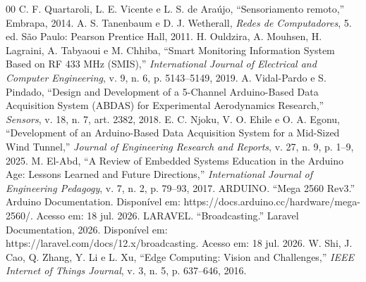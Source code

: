 \documentclass[conference]{IEEEtran}
\begin{document}
\begin{thebibliography}{00}
 C. F. Quartaroli, L. E. Vicente e L. S. de Araújo, ``Sensoriamento remoto,'' Embrapa, 2014.
 A. S. Tanenbaum e D. J. Wetherall, \textit{Redes de Computadores}, 5. ed. São Paulo: Pearson Prentice Hall, 2011.
 H. Ouldzira, A. Mouhsen, H. Lagraini, A. Tabyaoui e M. Chhiba, ``Smart Monitoring Information System Based on RF 433 MHz (SMIS),'' \textit{International Journal of Electrical and Computer Engineering}, v. 9, n. 6, p. 5143--5149, 2019.
 A. Vidal-Pardo e S. Pindado, ``Design and Development of a 5-Channel Arduino-Based Data Acquisition System (ABDAS) for Experimental Aerodynamics Research,'' \textit{Sensors}, v. 18, n. 7, art. 2382, 2018.
 E. C. Njoku, V. O. Ehile e O. A. Egonu, ``Development of an Arduino-Based Data Acquisition System for a Mid-Sized Wind Tunnel,'' \textit{Journal of Engineering Research and Reports}, v. 27, n. 9, p. 1--9, 2025.
 M. El-Abd, ``A Review of Embedded Systems Education in the Arduino Age: Lessons Learned and Future Directions,'' \textit{International Journal of Engineering Pedagogy}, v. 7, n. 2, p. 79--93, 2017.
 ARDUINO. ``Mega 2560 Rev3.'' Arduino Documentation. Dispon\'ivel em: https://docs.arduino.cc/hardware/mega-2560/. Acesso em: 18 jul. 2026.
 LARAVEL. ``Broadcasting.'' Laravel Documentation, 2026. Dispon\'ivel em: https://laravel.com/docs/12.x/broadcasting. Acesso em: 18 jul. 2026.
 W. Shi, J. Cao, Q. Zhang, Y. Li e L. Xu, ``Edge Computing: Vision and Challenges,'' \textit{IEEE Internet of Things Journal}, v. 3, n. 5, p. 637--646, 2016.
\end{thebibliography}
\end{document}
